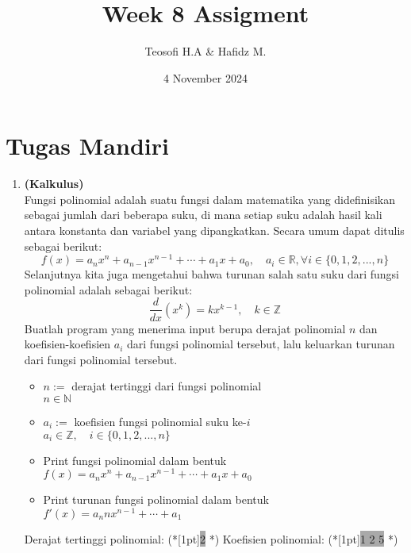 \documentclass{article}
\title{\textbf{Week 8 Assigment}}
\date{4 November 2024}
\author{Teosofi H.A \& Hafidz M.}
\newcommand{\enter}{\raisebox{-1.8pt}{\begin{tikzpicture}[scale=0.3]
    \draw[thin,fill=lightgray] (0,0) rectangle (2,1);
    \draw (0.3,0.3) -- (0.7,0.3)--(0.7,0.6);     
\end{tikzpicture}}}
\newcommand{\inputscan}[1]{\raisebox{0pt}[1pt]{\colorbox{darkgray}{#1}}}
\newcommand{\R}{\mathbb{R}}
\newcommand{\Z}{\mathbb{Z}}
\newcommand{\N}{\mathbb{N}}
\begin{document}
    \maketitle

    \section*{Tugas Mandiri}
    \begin{enumerate}[label=]
        \item \textbf{(Kalkulus)}\\
        Fungsi polinomial adalah suatu fungsi dalam matematika yang didefinisikan sebagai jumlah dari beberapa suku, di mana setiap suku adalah hasil kali antara konstanta dan variabel yang dipangkatkan. Secara umum dapat ditulis sebagai berikut:
        \[f(x) = a_nx^n + a_{n-1}x^{n-1} + \cdots + a_1x + a_0,\quad a_i \in \R, \forall i\in\{0,1,2,...,n\}\] 
        Selanjutnya kita juga mengetahui bahwa turunan salah satu suku dari fungsi polinomial adalah sebagai berikut:
        \[\frac{d}{dx}(x^k) = kx^{k-1},\quad k\in\Z\]
        Buatlah program yang menerima input berupa derajat polinomial $n$ dan koefisien-koefisien $a_i$ dari fungsi polinomial tersebut, lalu keluarkan turunan dari fungsi polinomial tersebut.
        \begin{req}
            \begin{itemize}
                \item $n:=$ derajat tertinggi dari fungsi polinomial\\
                $n\in\N$
                \item $a_i:=$ koefisien fungsi polinomial suku ke-$i$\\
                $a_i\in\Z,\quad i\in\{0,1,2,...,n\}$
            \end{itemize}
        \end{req}
        \begin{out}
            \begin{itemize}
                \item Print fungsi polinomial dalam bentuk $f(x) = a_nx^n + a_{n-1}x^{n-1} + \cdots + a_1x + a_0$
                \item Print turunan fungsi polinomial dalam bentuk $f'(x) = a_nnx^{n-1} + \cdots + a_1$
            \end{itemize}
        \end{out}
        \begin{RunCode}
Derajat tertinggi polinomial: (*\inputscan{2} \enter*)
Koefisien polinomial: (*\inputscan{1 2 5} \enter*)


\end{RunCode}
\end{enumerate}
\end{document}
